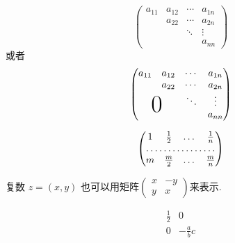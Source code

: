 \documentclass{article} %
\begin{document}
	\[
	\begin{pmatrix}
		a_{11} & a_{12} & \cdots & a_{1n} \\
		& a_{22} & \cdots & a_{2n} \\
		& & \ddots & \vdots \\
		& & & a_{nn}
	\end{pmatrix}
	\]
	或者
	\[
	\begin{pmatrix}
		a_{11} & a_{12} & \cdots & a_{1n} \\
		& a_{22} & \cdots & a_{2n} \\
		& & \ddots & \vdots \\
		\multicolumn{2}{c}{\raisebox{1.3ex}[0pt]{\Huge 0}}	
		& & a_{nn}
	\end{pmatrix}
	\]
	
	\[
	\begin{pmatrix}
		1 & \frac 12 & \dots & \frac 1n \\
		\hdotsfor{4} \\
		m & \frac m2 & \dots & \frac mn
	\end{pmatrix}
	\]
	
	复数 $z = (x, y)$ 也可以用矩阵\begin{math}
		\left( 		%
		\begin{smallmatrix}
			x & -y \\ y & x
		\end{smallmatrix}
		\right) 	%
	\end{math}来表示.

	\[
	\begin{array}{c|c}
		\frac 12 & 0 \\
		\hline
		0 & -\frac abc \\	%
	\end{array}
	\]
	
\end{document}
